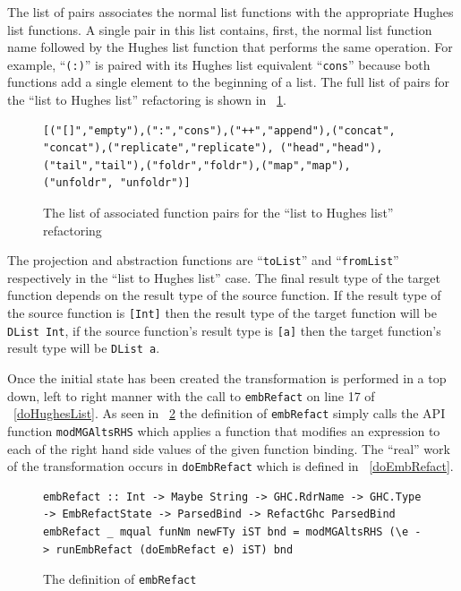 The list of pairs associates the normal list functions with the appropriate Hughes list functions. A single pair in this list contains, first, the normal list function name followed by the Hughes list function that performs the same operation. For example, ``\texttt{(:)}'' is paired with its Hughes list equivalent ``\texttt{cons}'' because both functions add a single element to the beginning of a list. The full list of pairs for the ``list to Hughes list'' refactoring is shown in \DIFdelbegin {}\DIFdelend \DIFaddbegin {}\DIFaddend ~\ref{assocFuns}.

\begin{figure}[t]
\begin{lstlisting}
[("[]","empty"),(":","cons"),("++","append"),("concat", "concat"),("replicate","replicate"), ("head","head"),("tail","tail"),("foldr","foldr"),("map","map"), ("unfoldr", "unfoldr")]
\end{lstlisting}
\caption{The list of associated function pairs for the ``list to Hughes list'' refactoring}
\label{assocFuns}
\end{figure} 

The projection and abstraction functions are ``\texttt{toList}'' and ``\texttt{fromList}'' respectively in the ``list to Hughes list'' case. The final result type of the target function depends on the result type of the source function. If the result type of the source function is \texttt{[Int]} then the result type of the target function will be \texttt{DList Int}, if the source function's result type is \texttt{[a]} then the target function's result type will be \texttt{DList a}.

Once the initial state has been created the transformation is performed in a top down, left to right manner with the call to \texttt{embRefact} on line 17 of \DIFdelbegin {}\DIFdelend \DIFaddbegin {}\DIFaddend ~\ref{doHughesList}. As seen in \DIFdelbegin {}\DIFdelend \DIFaddbegin {}\DIFaddend ~\ref{embRefact} the definition of \texttt{embRefact} simply calls the API function \texttt{modMGAltsRHS} which applies a function that modifies an expression to each of the right hand side values of the given function binding. The ``real'' work of the transformation occurs in \texttt{doEmbRefact} which is defined in \DIFdelbegin {}\DIFdelend \DIFaddbegin {}\DIFaddend ~\ref{doEmbRefact}.

\begin{figure}[t]
\begin{lstlisting}
embRefact :: Int -> Maybe String -> GHC.RdrName -> GHC.Type -> EmbRefactState -> ParsedBind -> RefactGhc ParsedBind
embRefact _ mqual funNm newFTy iST bnd = modMGAltsRHS (\e -> runEmbRefact (doEmbRefact e) iST) bnd
\end{lstlisting}
\caption{The definition of \texttt{embRefact}}
\label{embRefact}
\end{figure}

